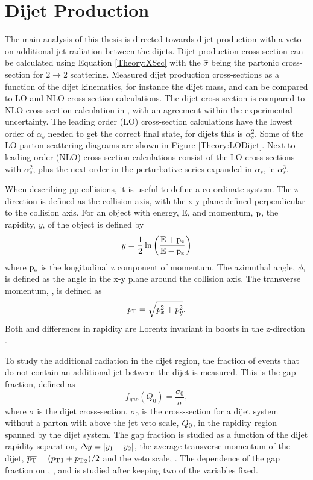 \section{Dijet Production}
\label{sec:Theory:Dijet}

The main analysis of this thesis is directed towards dijet production with a veto on additional jet radiation between the dijets.
Dijet production cross-section can be calculated using Equation \ref{Theory:XSec} with the $\hat{\sigma}$ being the partonic cross-section for $2\rightarrow 2$ scattering.
Measured dijet production cross-sections as a function of the dijet kinematics, for instance the dijet mass, and can be compared to LO and NLO cross-section calculations.
The dijet cross-section is compared to NLO cross-section calculation in \cite{ref:Dijet}, with an agreement within the experimental uncertainty.
The leading order (LO) cross-section calculations have the lowest order of $\alpha_{s}$ needed to get the correct final state, for dijets this is $\alpha_{s}^{2}$.
Some of the LO parton scattering diagrams are shown in Figure \ref{Theory:LODijet}.
Next-to-leading order (NLO) cross-section calculations consist of the LO cross-sections with $\alpha_{s}^{2}$, plus the next order in the perturbative series expanded in $\alpha_{s}$, ie $\alpha_{s}^{3}$.


When describing pp collisions, it is useful to define a co-ordinate system.
The z-direction is defined as the collision axis, with the x-y plane defined perpendicular to the collision axis.
For an object with energy, E, and momentum, $\bold{\rm p}$, the rapidity, $y$, of the object is defined by
\begin{equation}
y=\frac{1}{2}\ln\left(\rm \frac{E+p_z}{E-p_z}\right)
\label{Theory:Rapidity}
\end{equation}
where $\rm p_{z}$ is the longitudinal z component of momentum. 
The azimuthal angle, $\phi$, is defined as the angle in the x-y plane around the collision axis.
The transverse momentum, \pt{}, is defined as
\begin{equation}
\mbox{$p_{\rm T}$}{}=\sqrt{ p_{x}^{2} +  p_{y}^{2}}.
\label{Theory:pt}
\end{equation}
Both \pt{} and differences in rapidity are Lorentz invariant in boosts in the z-direction \cite{ref:Rapidity}.  
 

To study the additional radiation in the dijet region, the fraction of events that do not contain an additional jet between the dijet is measured.
This is the gap fraction, defined as
\begin{equation}
f_{gap}(Q_{0}) = \frac{\sigma_{0}}{\sigma},
\label{Theory:GapFraction}
\end{equation}
where $\sigma$ is the dijet cross-section,  $\sigma_{0}$ is the cross-section for a dijet system without a parton with \pt{} above the jet veto scale, $\mbox{$Q_0$}{}$, in the rapidity region spanned by the dijet system.
The gap fraction is studied as a function of the dijet rapidity separation, $\mbox{$\Delta y$}{}=|y_{1}-y_{2}|$, the average transverse momentum of the dijet, $\mbox{$\overline{p_{\rm T}}$}{}=(\mbox{$p_{\rm T}$}{}_{1}+\mbox{$p_{\rm T}$}_{2})/2$ and the veto scale, \qz{}.
The dependence of the gap fraction on \dy{}, \ptb{}, and \qz{} is studied after keeping two of the variables fixed.

